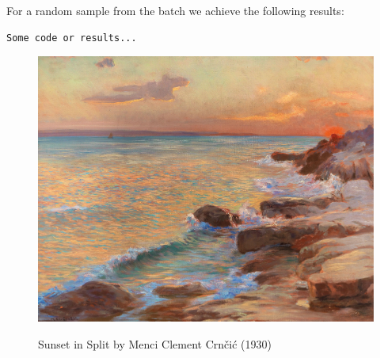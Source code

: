 \documentclass[a4paper,11pt]{article}
\newenvironment{commandline}{
	\medskip
	\begin{mdframed}[style=commandline]
	}{
	\end{mdframed}
	\medskip
}
\begin{document}
 For a random sample from the batch we achieve the following results:
\begin{commandline}
	\begin{verbatim}
Some code or results...
	\end{verbatim}
\end{commandline}
	\begin{figure}[!h]
	\centering
	\includegraphics[width=0.5\linewidth]{sunset_in_split}
	\label{fig:enter-label}
	\caption{Sunset in Split by Menci Clement Crnčić (1930)}
\end{figure}

 
\end{document}
